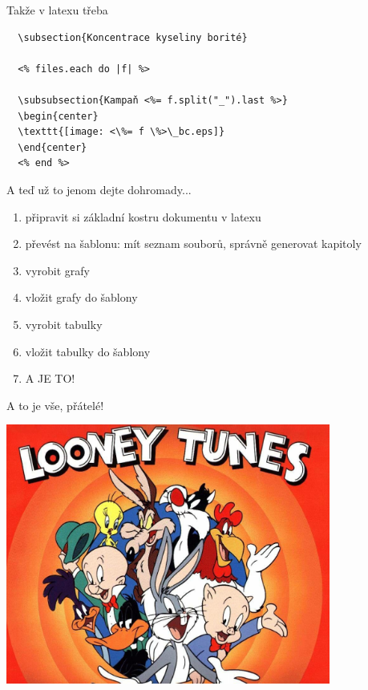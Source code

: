 \documentclass{beamer}
\begin{document}
\begin{frame}[fragile]{Takže v latexu třeba}
\scriptsize
\begin{verbatim}
  \subsection{Koncentrace kyseliny borité}

  <% files.each do |f| %>

  \subsubsection{Kampaň <%= f.split("_").last %>}
  \begin{center}
  \texttt{[image: <\%= f \%>\_bc.eps]}
  \end{center}
  <% end %>
\end{verbatim}
\end{frame}

\begin{frame}{A teď už to jenom dejte dohromady...}
  \begin{enumerate}
    \item připravit si základní kostru dokumentu v latexu
    \item převést na šablonu: mít seznam souborů, správně generovat kapitoly
    \item vyrobit grafy
    \item vložit grafy do šablony
    \item vyrobit tabulky
    \item vložit tabulky do šablony
    \item A JE TO!
  \end{enumerate}
\end{frame}

\begin{frame}{A to je vše, přátelé!}
  \begin{center}
    \includegraphics[width=0.8\textwidth]{looney_tunes}
  \end{center}
\end{frame}
\end{document}
